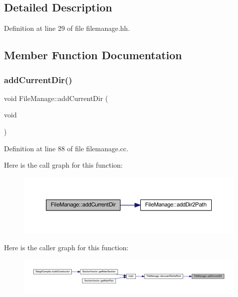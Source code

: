 \subsection{Detailed Description}


Definition at line 29 of file filemanage.\+hh.



\subsection{Member Function Documentation}
\mbox{\label{class_file_manage_a58692ff821c7b1570559291ea14be363}} 
\subsubsection{\texorpdfstring{addCurrentDir()}{addCurrentDir()}}
{\footnotesize\ttfamily void File\+Manage\+::add\+Current\+Dir (\begin{DoxyParamCaption}\item[{void}]{ }\end{DoxyParamCaption})}



Definition at line 88 of file filemanage.\+cc.

Here is the call graph for this function\+:
\nopagebreak
\begin{figure}[H]
\begin{center}
\leavevmode
\includegraphics[width=350pt]{class_file_manage_a58692ff821c7b1570559291ea14be363_cgraph}
\end{center}
\end{figure}
Here is the caller graph for this function\+:
\nopagebreak
\begin{figure}[H]
\begin{center}
\leavevmode
\includegraphics[width=350pt]{class_file_manage_a58692ff821c7b1570559291ea14be363_icgraph}
\end{center}
\end{figure}
\mbox{\label{class_file_manage_a326d24da789cd3adde140bd1c5e5b7e6}} 
